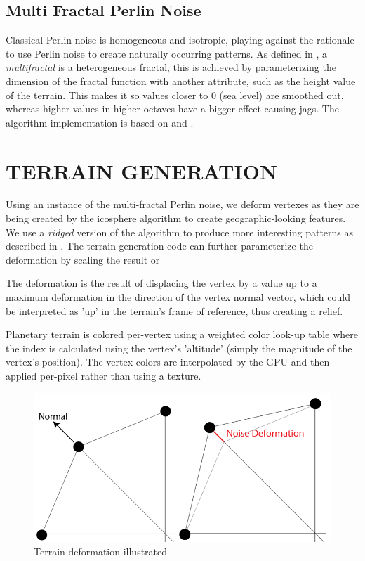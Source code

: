 \documentclass[a4paper,twoside]{article}
\begin{document}
\subsection{Multi Fractal Perlin Noise}
\label{sec:mfpnois}
Classical Perlin noise is homogeneous and isotropic, playing against the rationale to use Perlin noise to create naturally occurring patterns.  As defined in \cite{ondrej07}, a \textit{multifractal} is a heterogeneous fractal, this is achieved by parameterizing the dimension of the fractal function with another attribute, such as the height value of the terrain. This makes it so values closer to 0 (sea level) are smoothed out, whereas higher values in higher octaves have a bigger effect causing jags.  The algorithm implementation is based on \cite{pnoise} and \cite{ondrej07}.

\section{\uppercase{Terrain Generation}}
\label{sec:tgeneration}

\noindent Using an instance of the multi-fractal Perlin noise, we deform vertexes as they are being created by the icosphere algorithm to create geographic-looking features. We use a \textit{ridged} version of the algorithm to produce more interesting patterns as described in \cite{ondrej07}. The terrain generation code can further parameterize the deformation by scaling the result or 

The deformation is the result of displacing the vertex by a value up to a maximum deformation in the direction of the vertex normal vector, which could be interpreted as 'up' in the terrain's frame of reference, thus creating a relief.

Planetary terrain is colored per-vertex using a weighted color look-up table where the index is calculated using the vertex's 'altitude' (simply the magnitude of the vertex's position). The vertex colors are interpolated by the GPU and then applied per-pixel rather than using a texture.

\begin{figure}
\centering
\includegraphics[scale=0.25]{./images/normals_deformation.png}
\caption{Terrain deformation illustrated}
\label{fig_tda}
\end{figure}
\end{document}
